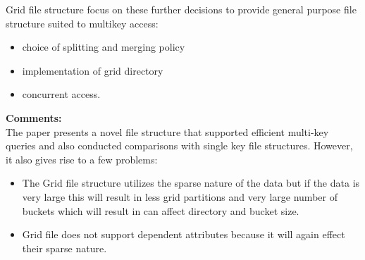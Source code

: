 \documentclass[a4paper,12pt, twoside]{article}
\begin{document}
Grid file structure focus on these further decisions to provide general purpose file structure suited to multikey access:
\begin{itemize}
	\item choice of splitting and merging policy
	\item implementation of grid directory
	\item concurrent access. 
\end{itemize}

\textbf{Comments:}\\
The paper presents a novel file structure that supported efficient multi-key queries and also conducted comparisons with single key file structures. However, it also gives rise to a few problems:
\begin{itemize}
	\item The Grid file structure utilizes the sparse nature of the data but if the data is very large this will result in less grid partitions and very large number of buckets which will result in can affect directory and bucket size. 
	\item Grid file does not support dependent attributes because it will again effect their sparse nature.
\end{itemize}
\end{document}
